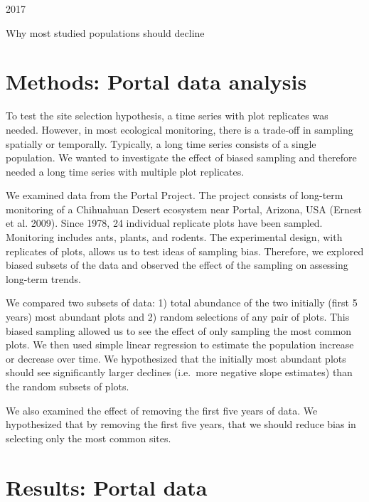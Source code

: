 \documentclass[]{article}
\title{}
\author{}
\date{}
\begin{document}
2017 \vspace{4cm}

\begin{center}
{\Large Why most studied populations should decline}

\vspace{4cm}

\end{center}

\section{Methods: Portal data analysis}

To test the site selection hypothesis, a time series with plot
replicates was needed. However, in most ecological monitoring, there is
a trade-off in sampling spatially or temporally. Typically, a long time
series consists of a single population. We wanted to investigate the
effect of biased sampling and therefore needed a long time series with
multiple plot replicates.

We examined data from the Portal Project. The project consists of
long-term monitoring of a Chihuahuan Desert ecosystem near Portal,
Arizona, USA (Ernest et al. 2009). Since 1978, 24 individual replicate
plots have been sampled. Monitoring includes ants, plants, and rodents.
The experimental design, with replicates of plots, allows us to test
ideas of sampling bias. Therefore, we explored biased subsets of the
data and observed the effect of the sampling on assessing long-term
trends.

We compared two subsets of data: 1) total abundance of the two initially
(first 5 years) most abundant plots and 2) random selections of any pair
of plots. This biased sampling allowed us to see the effect of only
sampling the most common plots. We then used simple linear regression to
estimate the population increase or decrease over time. We hypothesized
that the initially most abundant plots should see significantly larger
declines (i.e.~more negative slope estimates) than the random subsets of
plots.

We also examined the effect of removing the first five years of data. We
hypothesized that by removing the first five years, that we should
reduce bias in selecting only the most common sites.

\section{Results: Portal data}
\end{document}

